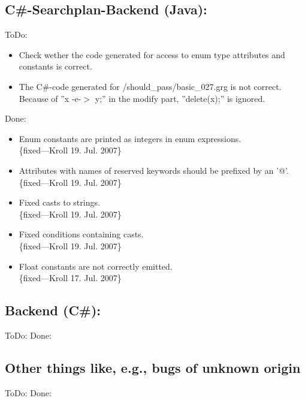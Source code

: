 \documentclass[12pt,a4paper]{article}
\begin{document}
\subsection*{C\#-Searchplan-Backend (Java):}
ToDo:
\begin{itemize}
	\item Check wether the code generated for access to enum type attributes and constants is correct.
	\item The C\#-code generated for {/should\_pass/basic\_027.grg} is not correct. Because of ''x -e-$>$ y;'' in the modify part, ''delete(x);'' is ignored.
\end{itemize}
Done:
\begin{itemize}
    \item Enum constants are printed as integers in enum expressions.\\
    \{fixed---Kroll 19. Jul. 2007\}
    \item Attributes with names of reserved keywords should be prefixed by an '@'.\\
    \{fixed---Kroll 19. Jul. 2007\}
    \item Fixed casts to strings.\\
    \{fixed---Kroll 19. Jul. 2007\}
    \item Fixed conditions containing casts.\\
    \{fixed---Kroll 19. Jul. 2007\}
    \item Float constants are not correctly emitted.\\
    \{fixed---Kroll 17. Jul. 2007\}
\end{itemize}


\subsection*{Backend (C\#):}
ToDo:
Done:



\subsection*{Other things like, e.g., bugs of unknown origin}
ToDo:
Done:
\end{document}
